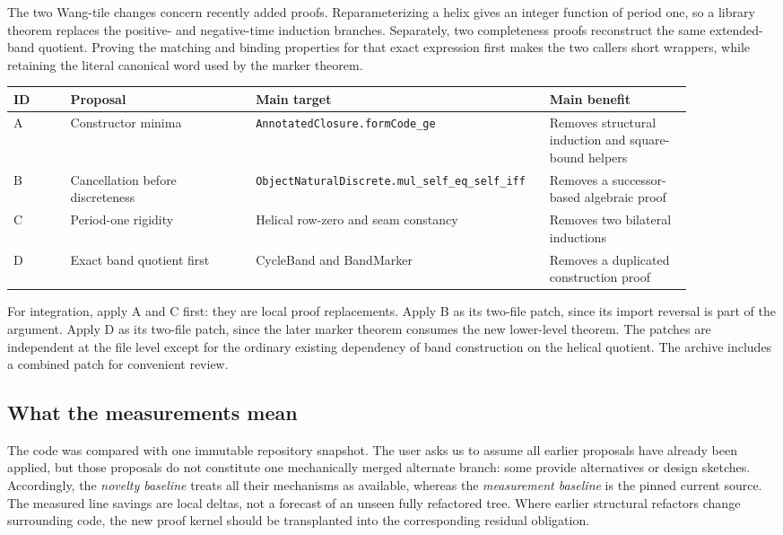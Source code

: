 \documentclass[11pt,letterpaper]{article}
\newcommand{\code}[1]{\nolinkurl{#1}}
\begin{document}
The two Wang-tile changes concern recently added proofs. Reparameterizing a helix gives an integer function of period one, so a library theorem replaces the positive- and negative-time induction branches. Separately, two completeness proofs reconstruct the same extended-band quotient. Proving the matching and binding properties for that exact expression first makes the two callers short wrappers, while retaining the literal canonical word used by the marker theorem.

\begin{center}
\begin{tabular}{p{0.08\linewidth}p{0.26\linewidth}p{0.34\linewidth}p{0.20\linewidth}}
\toprule
ID & Proposal & Main target & Main benefit\\
\midrule
A & Constructor minima & \code{AnnotatedClosure.formCode_ge} & Removes structural induction and square-bound helpers\\
B & Cancellation before discreteness & \code{ObjectNaturalDiscrete.mul_self_eq_self_iff} & Removes a successor-based algebraic proof\\
C & Period-one rigidity & Helical row-zero and seam constancy & Removes two bilateral inductions\\
D & Exact band quotient first & CycleBand and BandMarker & Removes a duplicated construction proof\\
\bottomrule
\end{tabular}
\end{center}

For integration, apply A and C first: they are local proof replacements. Apply B as its two-file patch, since its import reversal is part of the argument. Apply D as its two-file patch, since the later marker theorem consumes the new lower-level theorem. The patches are independent at the file level except for the ordinary existing dependency of band construction on the helical quotient. The archive includes a combined patch for convenient review.

\subsection{What the measurements mean}
The code was compared with one immutable repository snapshot. The user asks us to assume all earlier proposals have already been applied, but those proposals do not constitute one mechanically merged alternate branch: some provide alternatives or design sketches. Accordingly, the \emph{novelty baseline} treats all their mechanisms as available, whereas the \emph{measurement baseline} is the pinned current source. The measured line savings are local deltas, not a forecast of an unseen fully refactored tree. Where earlier structural refactors change surrounding code, the new proof kernel should be transplanted into the corresponding residual obligation.
\end{document}
